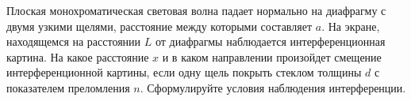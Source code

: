 \documentclass[__main__.tex]{subfiles}
\begin{document}
Плоская монохроматическая световая волна падает нормально на диафрагму с двумя узкими щелями, расстояние между которыми составляет $a$. На экране, находящемся на расстоянии $L$ от диафрагмы наблюдается интерференционная картина. На какое расстояние $x$ и в каком направлении произойдет смещение интерференционной картины, если одну щель покрыть стеклом толщины $d$ с показателем преломления $n$. Сформулируйте условия наблюдения интерференции.\\ 

\end{document}
